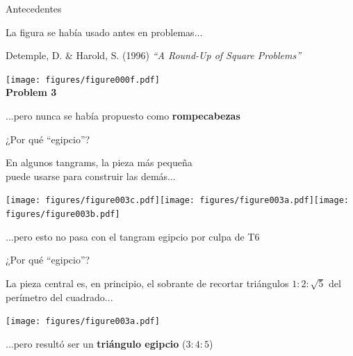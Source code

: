 \documentclass[14pt,aspectratio=169,usenames,dvipsnames]{beamer}
\begin{document}

    \begin{frame}{Antecedentes}
        \begin{center}
            La figura se había usado antes en problemas...

            \bigskip\medskip

            {\footnotesize Detemple, D. \& Harold, S. (1996) \emph{``A Round-Up of Square Problems''}}\\

            \bigskip

            \texttt{[image: figures/figure000f.pdf]}\\[-1ex]{\footnotesize \textbf{Problem 3}}

            \bigskip

            ...pero nunca se había propuesto como \textbf{rompecabezas}
        \end{center}
    \end{frame}


        \begin{frame}{¿Por qué ``egipcio''?}
        \begin{center}
            En algunos tangrams, la pieza más pequeña\\puede usarse para construir las demás...

            \bigskip \bigskip

            \texttt{[image: figures/figure003c.pdf]}\quad\texttt{[image: figures/figure003a.pdf]}\quad\texttt{[image: figures/figure003b.pdf]} \\

            \bigskip \bigskip

            ...pero esto no pasa con el tangram egipcio por culpa de T6
        \end{center}
    \end{frame}


    \begin{frame}{¿Por qué ``egipcio''?}
        \begin{center}
            La pieza central es, en principio, el sobrante de recortar triángulos $1\!\!:\!\!2\!\!:\!\!\sqrt{5}$ del perímetro del cuadrado...

            \bigskip \bigskip

            \texttt{[image: figures/figure003a.pdf]} \\

            \bigskip \bigskip

            ...pero resultó ser un \textbf{triángulo egipcio} ($3\!\!:\!\!4\!\!:\!\!5$)
        \end{center}
    \end{frame}
\end{document}
